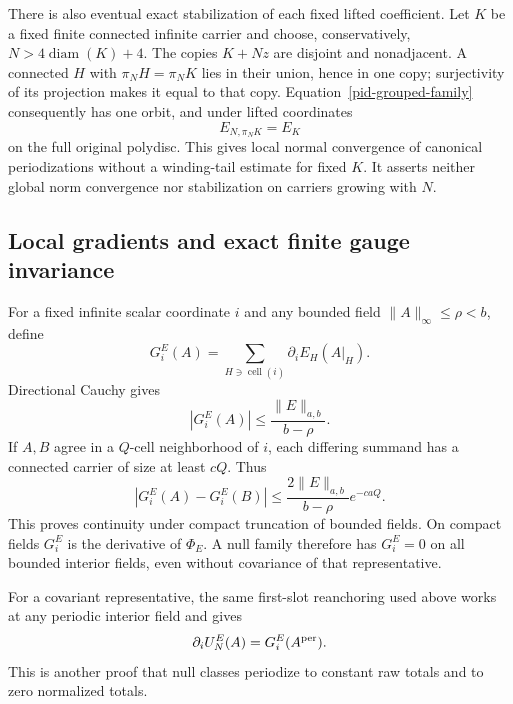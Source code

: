 \documentclass[11pt]{article}
\theoremstyle{remark}
\begin{document}
There is also eventual exact stabilization of each fixed lifted
coefficient. Let $K$ be a fixed finite connected infinite carrier
and choose, conservatively, $N>4\operatorname{diam}(K)+4$.
The copies $K+Nz$ are disjoint and nonadjacent. A connected $H$
with $\pi_NH=\pi_NK$ lies in their union, hence in one copy;
surjectivity of its projection makes it equal to that copy.
Equation~\eqref{pid-grouped-family} consequently has one orbit,
and under lifted coordinates
\begin{equation}
 E_{N,\pi_NK}=E_K
 \label{pid-fixed-carrier}
\end{equation}
on the full original polydisc. This gives local normal convergence
of canonical periodizations without a winding-tail estimate for
fixed $K$. It asserts neither global norm convergence nor
stabilization on carriers growing with $N$.

\subsection{Local gradients and exact finite gauge invariance}
\label{pid-gauge-section}

For a fixed infinite scalar coordinate $i$ and any bounded field
$\|A\|_\infty\le\rho<b$, define
\begin{equation}
 G_i^E(A)=\sum_{H\ni\operatorname{cell}(i)}
                                 \partial_iE_H(A|_H).
 \label{pid-gradient}
\end{equation}
Directional Cauchy gives
\begin{equation}
 |G_i^E(A)|\le\frac{\|E\|_{a,b}}{b-\rho}.
 \label{pid-gradient-bound}
\end{equation}
If $A,B$ agree in a $Q$-cell neighborhood of $i$, each differing
summand has a connected carrier of size at least $cQ$. Thus
\begin{equation}
 |G_i^E(A)-G_i^E(B)|
       \le\frac{2\|E\|_{a,b}}{b-\rho}e^{-caQ}.
 \label{pid-gradient-tail}
\end{equation}
This proves continuity under compact truncation of bounded
fields. On compact fields $G_i^E$ is the derivative of
$\Phi_E$. A null family therefore has $G_i^E=0$ on all
bounded interior fields, even without covariance of that
representative.

For a covariant representative, the same first-slot reanchoring
used above works at any periodic interior field and gives
\begin{equation}
 \partial_iU_N^E(A)=G_i^E(A^{\rm per}).
 \label{pid-periodic-gradient}
\end{equation}
This is another proof that null classes periodize to constant
raw totals and to zero normalized totals.
\end{document}
